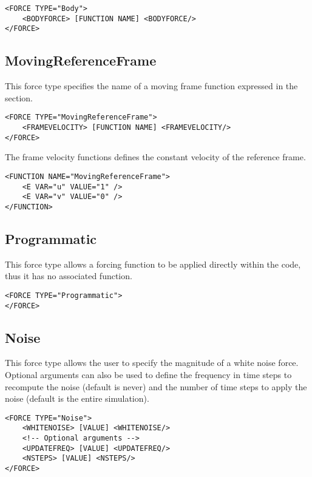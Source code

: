 \begin{lstlisting}[style=XMLStyle] 
<FORCE TYPE="Body">
    <BODYFORCE> [FUNCTION NAME] <BODYFORCE/>
</FORCE>
\end{lstlisting}

\subsection{MovingReferenceFrame}
This force type specifies the name of a moving frame function expressed in the  section.

\begin{lstlisting}[style=XMLStyle]
<FORCE TYPE="MovingReferenceFrame">
    <FRAMEVELOCITY> [FUNCTION NAME] <FRAMEVELOCITY/>
</FORCE>
\end{lstlisting}

The frame velocity functions defines the constant velocity of the reference frame.

\begin{lstlisting}[style=XMLStyle]
<FUNCTION NAME="MovingReferenceFrame">
    <E VAR="u" VALUE="1" />
    <E VAR="v" VALUE="0" />
</FUNCTION>
\end{lstlisting}

\subsection{Programmatic}
This force type allows a forcing function to be applied directly within the code, thus it has no associated function. 

\begin{lstlisting}[style=XMLStyle] 
<FORCE TYPE="Programmatic">
</FORCE>
\end{lstlisting}


\subsection{Noise}
This force type allows the user to specify the magnitude of a white noise force. 
Optional arguments can also be used to define the frequency in time steps to recompute the noise (default is never)
 and the number of time steps to apply the noise (default is the entire simulation).  

\begin{lstlisting}[style=XMLStyle] 
<FORCE TYPE="Noise">
    <WHITENOISE> [VALUE] <WHITENOISE/>
    <!-- Optional arguments -->
    <UPDATEFREQ> [VALUE] <UPDATEFREQ/>
    <NSTEPS> [VALUE] <NSTEPS/>
</FORCE>
\end{lstlisting}
